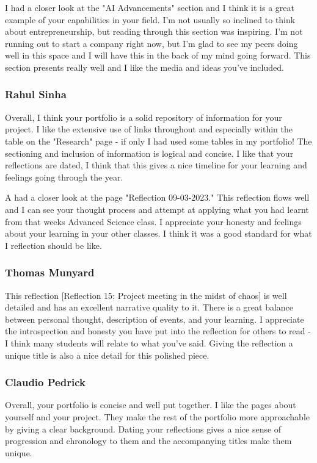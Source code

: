 \documentclass[11pt]{article}
\begin{document}
I had a closer look at the "AI Advancements" section and I think it is a great example of your capabilities in your field. I'm not usually so inclined to think about entrepreneurship, but reading through this section was inspiring. I'm not running out to start a company right now, but I'm glad to see my peers doing well in this space and I will have this in the back of my mind going forward. This section presents really well and I like the media and ideas you've included.

\subsubsection{Rahul Sinha}

Overall, I think your portfolio is a solid repository of information for your project. I like the extensive use of links throughout and especially within the table on the "Research" page - if only I had used some tables in my portfolio! The sectioning and inclusion of information is logical and concise. I like that your reflections are dated, I think that this gives a nice timeline for your learning and feelings going through the year. 

A had a closer look at the page "Reflection 09-03-2023." This reflection flows well and I can see your thought process and attempt at applying what you had learnt from that weeks Advanced Science class. I appreciate your honesty and feelings about your learning in your other classes. I think it was a good standard for what I reflection should be like.

\subsubsection{Thomas Munyard}

This reflection [Reflection 15: Project meeting in the midst of chaos] is well detailed and has an excellent narrative quality to it. There is a great balance between personal thought, description of events, and your learning. I appreciate the introspection and honesty you have put into the reflection for others to read - I think many students will relate to what you've said. Giving the reflection a unique title is also a nice detail for this polished piece.

\subsubsection{Claudio Pedrick}

Overall, your portfolio is concise and well put together. I like the pages about yourself and your project. They make the rest of the portfolio more approachable by giving a clear background. Dating your reflections gives a nice sense of progression and chronology to them and the accompanying titles make them unique. 
\end{document}
